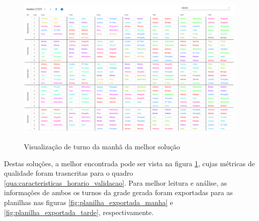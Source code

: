 \begin{figure}[p]
	\centering
	\caption{Visualização de turno da manhã da melhor solução}
	\includegraphics[width=1\textwidth]{./dados/figuras/horario_exportado_manha}
	\label{fig:horario_exportado_manha}
\end{figure}

Destas soluções, a melhor encontrada pode ser vista na figura \ref{fig:horario_exportado_manha}, cujas métricas de qualidade foram trasncritas para o quadro \ref{qua:caracteristicas_horario_validacao}. Para melhor leitura e análise, as informações de ambos os turnos da grade gerada foram exportadas para as planilhas nas figuras \ref{fig:planilha_exportada_manha} e \ref{fig:planilha_exportada_tarde}, respectivamente.

